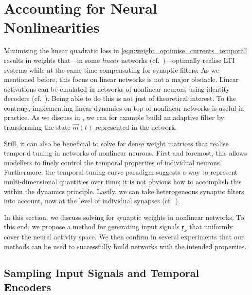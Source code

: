 
\section{Accounting for Neural Nonlinearities}
\label{sec:recurrent_weights}

Minimising the linear quadratic loss in \cref{eqn:weight_optimise_currents_temporal} results in weights that---in some \emph{linear} networks (cf.~)---optimally realise LTI systems while at the same time compensating for synaptic filters.
As we mentioned before, this focus on linear networks is not a major obstacle.
Linear activations can be emulated in networks of nonlinear neurons using \NEF identity decoders (cf.~).
Being able to do this is not just of theoretical interest. To the contrary, implementing linear dynamics on top of nonlinear networks is useful in practice.
As we discuss in , we can for example build an adaptive filter by transforming the state $\vec m(t)$ represented in the network.

Still, it can also be beneficial to solve for dense weight matrices that realise temporal tuning in networks of nonlinear neurons.
First and foremost, this allows modellers to finely control the temporal properties of individual neurons.
Furthermore, the temporal tuning curve paradigm suggests a way to represent multi-dimensional quantities over time; it is not obvious how to accomplish this within the \NEF dynamics principle.
Lastly, we can take heterogeneous synaptic filters into account, now at the level of individual synapses (cf.~).

In this section, we discuss solving for synaptic weights in nonlinear networks.
To this end, we propose a method for generating input signals $\mathfrak{x}_k$ that uniformly cover the neural activity space.
We then confirm in several experiments that our methods can be used to successfully build networks with the intended properties.

\subsection{Sampling Input Signals and Temporal Encoders}
\label{sec:solve_dynamics_nonlinear_neurons}

